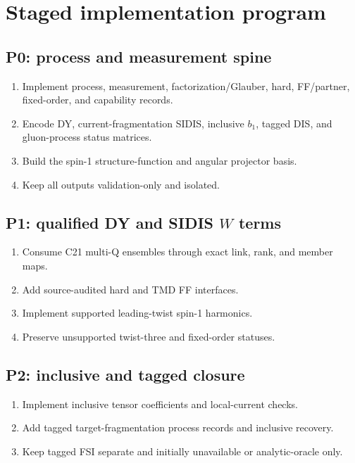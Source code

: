 \documentclass[11pt]{article}
\begin{document}
\section{Staged implementation program}
\label{sec:stages}

\subsection{P0: process and measurement spine}

\begin{enumerate}
\item Implement process, measurement, factorization/Glauber, hard, FF/partner, fixed-order, and capability records.
\item Encode DY, current-fragmentation SIDIS, inclusive \(b_1\), tagged DIS, and gluon-process status matrices.
\item Build the spin-1 structure-function and angular projector basis.
\item Keep all outputs validation-only and isolated.
\end{enumerate}

\subsection{P1: qualified DY and SIDIS \texorpdfstring{\(W\)}{W} terms}

\begin{enumerate}
\item Consume C21 multi-Q ensembles through exact link, rank, and member maps.
\item Add source-audited hard and TMD FF interfaces.
\item Implement supported leading-twist spin-1 harmonics.
\item Preserve unsupported twist-three and fixed-order statuses.
\end{enumerate}

\subsection{P2: inclusive and tagged closure}

\begin{enumerate}
\item Implement inclusive tensor coefficients and local-current checks.
\item Add tagged target-fragmentation process records and inclusive recovery.
\item Keep tagged FSI separate and initially unavailable or analytic-oracle only.
\end{enumerate}
\end{document}
